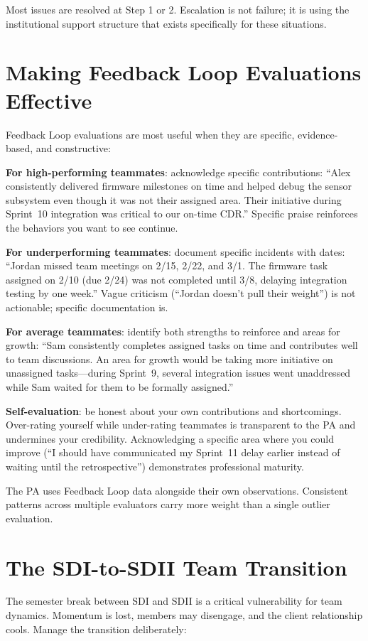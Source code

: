 Most issues are resolved at Step 1 or 2. Escalation is not failure; it is using the institutional support structure that exists specifically for these situations.



\section{Making Feedback Loop Evaluations Effective}
Feedback Loop evaluations are most useful when they are specific, evidence-based, and constructive:

\textbf{For high-performing teammates}: acknowledge specific contributions: ``Alex consistently delivered firmware milestones on time and helped debug the sensor subsystem even though it was not their assigned area. Their initiative during Sprint~10 integration was critical to our on-time CDR.'' Specific praise reinforces the behaviors you want to see continue.

\textbf{For underperforming teammates}: document specific incidents with dates: ``Jordan missed team meetings on 2/15, 2/22, and 3/1. The firmware task assigned on 2/10 (due 2/24) was not completed until 3/8, delaying integration testing by one week.'' Vague criticism (``Jordan doesn't pull their weight'') is not actionable; specific documentation is.

\textbf{For average teammates}: identify both strengths to reinforce and areas for growth: ``Sam consistently completes assigned tasks on time and contributes well to team discussions. An area for growth would be taking more initiative on unassigned tasks---during Sprint~9, several integration issues went unaddressed while Sam waited for them to be formally assigned.''

\textbf{Self-evaluation}: be honest about your own contributions and shortcomings. Over-rating yourself while under-rating teammates is transparent to the PA and undermines your credibility. Acknowledging a specific area where you could improve (``I should have communicated my Sprint~11 delay earlier instead of waiting until the retrospective'') demonstrates professional maturity.

The PA uses Feedback Loop data alongside their own observations. Consistent patterns across multiple evaluators carry more weight than a single outlier evaluation.



\section{The SDI-to-SDII Team Transition}
The semester break between SDI and SDII is a critical vulnerability for team dynamics. Momentum is lost, members may disengage, and the client relationship cools. Manage the transition deliberately:

